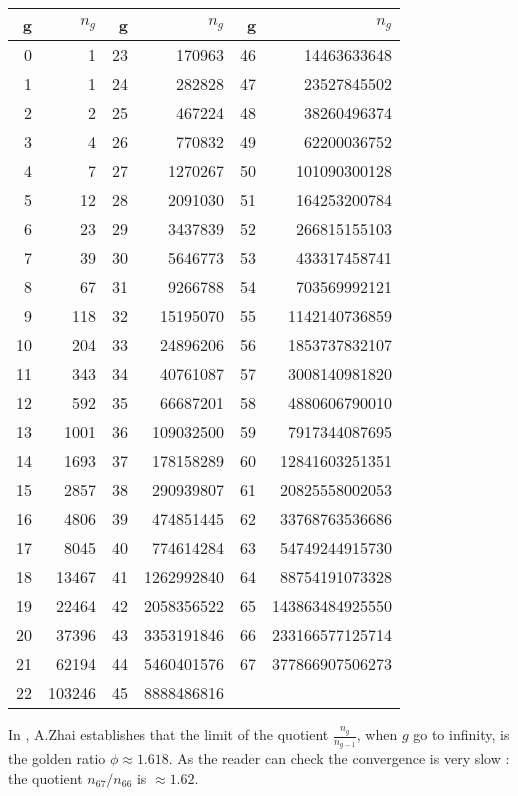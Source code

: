 \documentclass[reqno,11pt]{amsart}
\theoremstyle{plain}
\theoremstyle{definition}
\begin{document}
\begin{center}
\begin{tabular}{|r|r||r|r||r|r|}
\hline
g & $n_g$ & g & $n_g$ & g & $n_g$ \\
\hline
0 & 1 & 23 & 170963 & 46 & 14463633648\\
1 & 1 & 24 & 282828 & 47 & 23527845502\\
2 & 2 & 25 & 467224 & 48 & 38260496374\\
3 & 4 & 26 & 770832 & 49 & 62200036752\\
4 & 7 & 27 & 1270267 & 50 & 101090300128\\
5 & 12 & 28 & 2091030 & 51 & 164253200784\\
6 & 23 & 29 & 3437839 & 52 & 266815155103\\
7 & 39 & 30 & 5646773 & 53 & 433317458741\\
8 & 67 & 31 & 9266788 & 54 & 703569992121\\
9 & 118 & 32 & 15195070 & 55 & 1142140736859\\
10 & 204 & 33 & 24896206 & 56 & 1853737832107\\
11 & 343 & 34 & 40761087 & 57 & 3008140981820\\
12 & 592 & 35 & 66687201 & 58 & 4880606790010\\
13 & 1001 & 36 & 109032500 & 59 & 7917344087695\\
14 & 1693 & 37 & 178158289 & 60 & 12841603251351\\
15 & 2857 & 38 & 290939807 & 61 & 20825558002053\\
16 & 4806 & 39 & 474851445 & 62 & 33768763536686\\
17 & 8045 & 40 & 774614284 & 63 & 54749244915730\\
18 & 13467 & 41 & 1262992840 & 64 & 88754191073328\\
19 & 22464 & 42 & 2058356522 & 65 & 143863484925550\\
20 & 37396 & 43 & 3353191846 & 66 & 233166577125714\\
21 & 62194 & 44 & 5460401576 & 67 & 377866907506273\\
22 & 103246 & 45 & 8888486816 & \\
\hline
\end{tabular}
\end{center}

In \cite{Zhai}, A.Zhai establishes that the limit of the quotient   $\frac{n_g}{n_{g-1}}$, when $g$ go to infinity, is the golden ratio $\phi\approx 1.618$. As the reader can check the convergence is very slow : the quotient $n_{67}/n_{66}$ is $\approx 1.62$.
\end{document}
